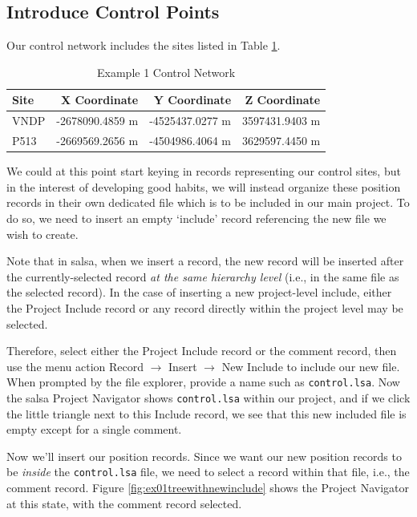 \subsection{Introduce Control Points}

Our control network includes the sites listed in Table \ref{tab:ex1control}.

\begin{table}[htb]
\caption{Example 1 Control Network}
\label{tab:ex1control}
\begin{center}
\begin{tabular}{lrrr}
\hline
\textbf{Site} & \textbf{X Coordinate} & \textbf{Y Coordinate} & \textbf{Z Coordinate} \\
\hline
VNDP & -2678090.4859 m & -4525437.0277 m & 3597431.9403 m \\
P513 & -2669569.2656 m & -4504986.4064 m & 3629597.4450 m \\
\hline
\end{tabular}
\end{center}
\end{table}

We could at this point start keying in records representing our control sites, but in the interest of developing good habits, we will instead organize these position records in their own dedicated file which is to be included in our main project.  To do so, we need to insert an empty `include' record referencing the new file we wish to create.

Note that in \textsf{salsa}, when we insert a record, the new record will be inserted after the currently-selected record \emph{at the same hierarchy level} (i.e., in the same file as the selected record).  In the case of inserting a new project-level include, either the Project Include record or any record directly within the project level may be selected.

Therefore, select either the Project Include record or the comment record, then use the menu action Record $\to$ Insert $\to$ New Include to include our new file.  When prompted by the file explorer, provide a name such as \verb+control.lsa+.  Now the \textsf{salsa} Project Navigator shows \verb+control.lsa+ within our project, and if we click the little triangle next to this Include record, we see that this new included file is empty except for a single comment.

Now we'll insert our position records.  Since we want our new position records to be \emph{inside} the \verb+control.lsa+ file, we need to select a record within that file, i.e., the comment record.  Figure \ref{fig:ex01treewithnewinclude} shows the Project Navigator at this state, with the comment record selected.


